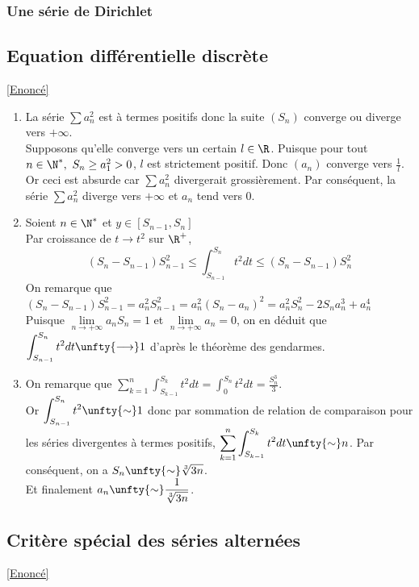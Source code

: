 \documentclass{book}
\begin{document}
	\subsubsection{Une série de Dirichlet}
	
	\subsection{Equation différentielle discrète }
	\label{sec:equation-differentielle-discreteetoile3}
	\textcolor{blue}{\hyperref[Equation différentielle discrète]{[Enoncé]}}\\
	\begin{enumerate}
		\item La série $\displaystyle\sum a_n^2$ est à termes positifs donc la suite $(S_n)$ converge ou diverge vers $+\infty$.\\ Supposons qu'elle converge vers un certain $l\in\R$. Puisque pour tout $n\in \N^*,\ S_n\geq a_1^2>0$, $l$ est strictement positif. Donc $(a_n)$ converge vers $\displaystyle\frac{1}{l}$. Or ceci est absurde car $\displaystyle\sum a_n^2$ divergerait grossièrement. Par conséquent, la série $\displaystyle\sum a_n^2$ diverge vers $+\infty$ et $a_n$ tend vers 0.
		\item Soient $n\in\N^*$ et $y\in[S_{n-1},S_n]$\\Par croissance de $t\to t^2$ sur $\R^+$, $$(S_n-S_{n-1})S_{n-1}^2\leq\displaystyle\int_{S_{n-1}}^{S_n}t^2dt\leq(S_n-S_{n-1})S_{n}^2$$
		On remarque que $(S_n-S_{n-1})S_{n-1}^2=a_n^2S_{n-1}^2=a_n^2(S_n-a_n)^2=a_n^2S_n^2-2S_na_n^3+a_n^4$\\ Puisque $\lim\limits_{n\to+\infty}a_nS_n=1$ et $\lim\limits_{n\to +\infty}a_n=0$, on en déduit que $\displaystyle\int_{S_{n-1}}^{S_n}t^2dt\unfty{\longrightarrow}1$ d'après le théorème des gendarmes.
		\item On remarque que $\displaystyle\sum\limits_{k=1}^n\displaystyle\int_{S_{k-1}}^{S_k}t^2dt=\displaystyle\int_{0}^{S_n}t^2dt=\frac{S_n^3}{3}$.
		\\ Or $\displaystyle\int_{S_{n-1}}^{S_n}t^2\unfty{\sim}1$ donc par sommation de relation de comparaison pour les séries divergentes à termes positifs, $\displaystyle\sum\limits_{k=1}^n\displaystyle\int_{S_{k-1}}^{S_k}t^2dt\unfty{\sim}n$. Par conséquent, on a $S_n \unfty{\sim}\sqrt[3]{3n}$.
		\\Et finalement $a_n\unfty{\sim}\displaystyle\frac{1}{\sqrt[3]{3n}}$.
	\end{enumerate}
	
	\subsection{Critère spécial des séries alternées}
	\label{sec:critere-special-des-series-alternees}
	\textcolor{blue}{\hyperref[Critère spécial des séries alternées]{[Enoncé]}}\\
	
\end{document}

